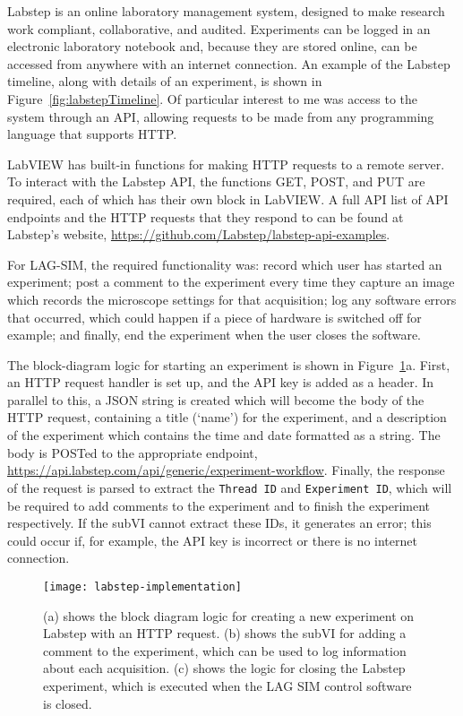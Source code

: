 Labstep is an online laboratory management system, designed to make research work compliant, collaborative, and audited. 
Experiments can be logged in an electronic laboratory notebook and, because they are stored online, can be accessed from anywhere with an internet connection.
An example of the Labstep timeline, along with details of an experiment, is shown in Figure~\ref{fig:labstepTimeline}. 
Of particular interest to me was access to the system through an API, allowing requests to be made from any programming language that supports HTTP. 

LabVIEW has built-in functions for making HTTP requests to a remote server. 
To interact with the Labstep API, the functions GET, POST, and PUT are required, each of which has their own block in LabVIEW. 
A full API list of API endpoints and the HTTP requests that they respond to can be found at Labstep's website, \url{https://github.com/Labstep/labstep-api-examples}. 

For LAG-SIM, the required functionality was: record which user has started an experiment; post a comment to the experiment every time they capture an image which records the microscope settings for that acquisition; log any software errors that occurred, which could happen if a piece of hardware is switched off for example; and finally, end the experiment when the user closes the software. 

The block-diagram logic for starting an experiment is shown in Figure~\ref{fig:labstep-implementation}a. 
First, an HTTP request handler is set up, and the API key is added as a header. 
In parallel to this, a JSON string is created which will become the body of the HTTP request, containing a title (`name') for the experiment, and a description of the experiment which contains the time and date formatted as a string. 
The body is POSTed to the appropriate endpoint, \url{https://api.labstep.com/api/generic/experiment-workflow}. 
Finally, the response of the request is parsed to extract the \texttt{Thread ID} and \texttt{Experiment ID}, which will be required to add comments to the experiment and to finish the experiment respectively. 
If the subVI cannot extract these IDs, it generates an error; this could occur if, for example, the API key is incorrect or there is no internet connection. 

\begin{figure}[p]
\centering
\texttt{[image: labstep-implementation]}
\caption[SubVIs for uploading experiment information to Labstep]{(a) shows the block diagram logic for creating a new experiment on Labstep with an HTTP request. (b) shows the subVI for adding a comment to the experiment, which can be used to log information about each acquisition. (c) shows the logic for closing the Labstep experiment, which is executed when the LAG SIM control software is closed. }
\label{fig:labstep-implementation}
\end{figure}

